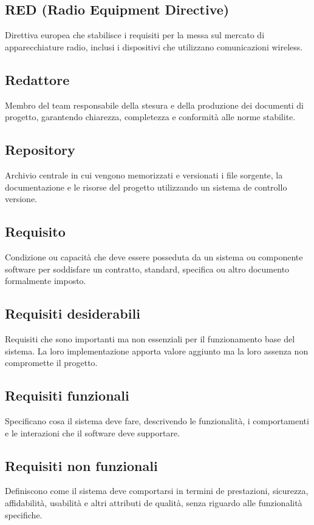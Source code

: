 \documentclass[a4paper,11pt]{article}
\begin{document}
\subsection{RED (Radio Equipment Directive)}
Direttiva europea che stabilisce i requisiti per la messa sul mercato di apparecchiature radio, inclusi i dispositivi che utilizzano comunicazioni wireless.

\subsection{Redattore}
Membro del team responsabile della stesura e della produzione dei documenti di progetto, garantendo chiarezza, completezza e conformità alle norme stabilite.

\subsection{Repository}
Archivio centrale in cui vengono memorizzati e versionati i file sorgente, la documentazione e le risorse del progetto utilizzando un sistema de controllo versione.

\subsection{Requisito}
Condizione ou capacità che deve essere posseduta da un sistema ou componente software per soddisfare un contratto, standard, specifica ou altro documento formalmente imposto.

\subsection{Requisiti desiderabili}
Requisiti che sono importanti ma non essenziali per il funzionamento base del sistema. La loro implementazione apporta valore aggiunto ma la loro assenza non compromette il progetto.

\subsection{Requisiti funzionali}
Specificano cosa il sistema deve fare, descrivendo le funzionalità, i comportamenti e le interazioni che il software deve supportare.

\subsection{Requisiti non funzionali}
Definiscono come il sistema deve comportarsi in termini de prestazioni, sicurezza, affidabilità, usabilità e altri attributi de qualità, senza riguardo alle funzionalità specifiche.
\end{document}
